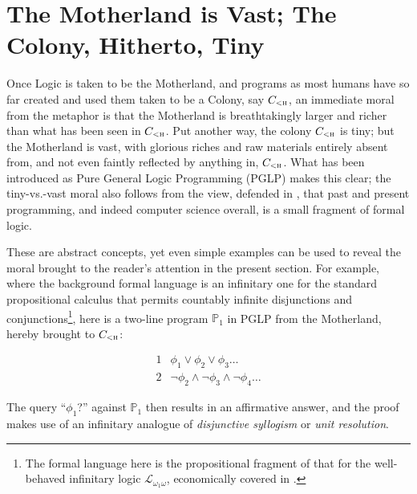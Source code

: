 \documentclass{article}
\begin{document}
\section{The Motherland is Vast; The Colony, Hitherto, Tiny}
\label{sect:motherlandvast_colonytiny}

\noindent
%
Once Logic is taken to be the Motherland, and programs as most humans
have so far created and used them taken to be a Colony, say
$C_\textsc{<h}$, an immediate moral from the metaphor is that the
Motherland is breathtakingly larger and richer than what has been seen
in $C_\textsc{<h}$.  Put another way, the colony $C_\textsc{<h}$ is
tiny; but the Motherland is vast, with glorious riches and raw
materials entirely absent from, and not even faintly reflected by
anything in, $C_\textsc{<h}$.  What has been introduced as Pure
General Logic Programming (PGLP) \cite{introduction_of_PGLP} makes
this clear; the tiny-vs.-vast moral also follows from the view,
defended in \cite{comp_sci_immaterial_formal_logic}, that past and
present programming, and indeed computer science overall, is a small
fragment of formal logic.

These are abstract concepts, yet even simple examples can be used to
reveal the moral brought to the reader's attention in the present
section.  For example, where the background formal language is an
infinitary one for the standard propositional calculus that permits
countably infinite disjunctions and conjunctions\footnote{The formal
  language here is the propositional fragment of that for the
  well-behaved infinitary logic $\mathscr{L}_{\omega_1 \omega}$,
  economically covered in \cite{ebb.flum.thomas.2nded}.}, here is a
two-line program $\mathbb{P}_1$ in PGLP from the Motherland, hereby
brought to $C_\textsc{<h}$:

\medskip
$$
\begin{array}{l|l}
 1 &  \phi_1 \vee \phi_2 \vee \phi_3 \ldots\\
  2 & \neg \phi_2 \wedge \neg \phi_3 \wedge \neg \phi_4 \ldots 
\end{array}
$$
\medskip
                    
\noindent
%
The query ``$\phi_1$?'' against $\mathbb{P}_1$ then results in an
affirmative answer, and the proof makes use of an infinitary analogue
of \textit{disjunctive syllogism} or \textit{unit resolution}.











\end{document}
